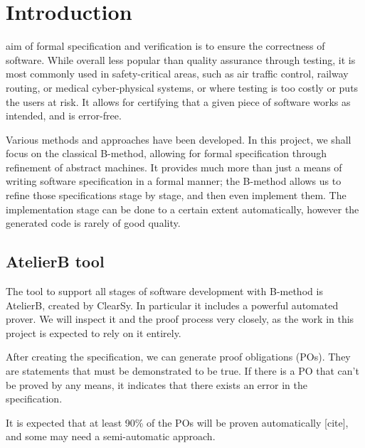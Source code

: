 \documentclass[11pt,journal]{IEEEtran}
\begin{document}
	
	\IEEEpeerreviewmaketitle
	
	
	
	\section{Introduction}
	 aim of formal specification and verification is to ensure the correctness of software. While overall less popular than quality assurance through testing, it is most commonly used in safety-critical areas, such as air traffic control, railway routing, or medical cyber-physical systems, or where testing is too costly or puts the users at risk. It allows for certifying that a given piece of software works as intended, and is error-free.
	
	Various methods and approaches have been developed. In this project, we shall focus on the classical B-method, allowing for formal specification through refinement of abstract machines. It provides much more than just a means of writing software specification in a formal manner; the B-method allows us to refine those specifications stage by stage, and then even implement them. The implementation stage can be done to a certain extent automatically, however the generated code is rarely of good quality.
	
	\subsection{AtelierB tool}
	The tool to support all stages of software development with B-method is AtelierB, created by ClearSy. In particular it includes a powerful automated prover. We will inspect it and the proof process very closely, as the work in this project is expected to rely on it entirely.
	
	After creating the specification, we can generate proof obligations (POs). They are statements that must be demonstrated to be true. If there is a PO that can't be proved by any means, it indicates that there exists an error in the specification.
	
	It is expected that at least 90\% of the POs will be proven automatically [cite], and some may need a semi-automatic approach.
	
\end{document}
